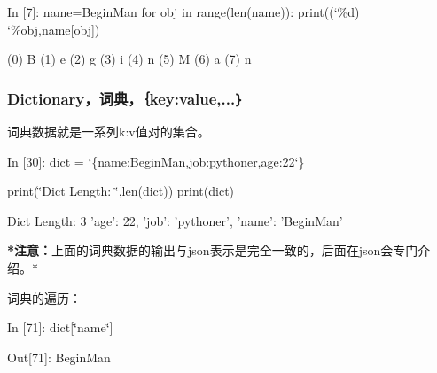 \documentclass[letterpaper,10pt,english]{sphinxmanual}
\def\PYGZob{\char`\{}
\def\PYGZcb{\char`\}}
\def\PYGZpc{\char`\%}
\def\PYGZsq{\char`\'}
\def\PYGZdq{\char`\"}
\renewcommand\PYGZsq{\textquotesingle}
\begin{document}
\begin{OriginalVerbatim}[commandchars=\\\{\}]
\textcolor{nbsphinxin}{In [7]: }name=\PYGZsq{}BeginMan\PYGZsq{}
        for obj in range(len(name)):
            print(\PYGZsq{}(\PYGZpc{}d)\PYGZsq{} \PYGZpc{}obj,name[obj])
\end{OriginalVerbatim}
\begin{OriginalVerbatim}[commandchars=\\\{\}]
(0) B
(1) e
(2) g
(3) i
(4) n
(5) M
(6) a
(7) n
\end{OriginalVerbatim}

\subsubsection{Dictionary，词典，｛key:value,...｝}
\label{pystart/pystart_databasic:Dictionary_uff0c_u8bcd_u5178_uff0c_uff5bkey:value,..._uff5d}
词典数据就是一系列k:v值对的集合。

\begin{OriginalVerbatim}[commandchars=\\\{\}]
\textcolor{nbsphinxin}{In [30]: }dict = \PYGZob{}\PYGZsq{}name\PYGZsq{}:\PYGZsq{}BeginMan\PYGZsq{},\PYGZsq{}job\PYGZsq{}:\PYGZsq{}pythoner\PYGZsq{},\PYGZsq{}age\PYGZsq{}:22\PYGZcb{}
         
         print(\PYGZdq{}Dict Length: \PYGZdq{},len(dict))
         print(dict)
\end{OriginalVerbatim}
\begin{OriginalVerbatim}[commandchars=\\\{\}]
Dict Length:  3
{'age': 22, 'job': 'pythoner', 'name': 'BeginMan'}
\end{OriginalVerbatim}
\textbf{*注意：}上面的词典数据的输出与json表示是完全一致的，后面在json会专门介绍。*

词典的遍历：

\begin{OriginalVerbatim}[commandchars=\\\{\}]
\textcolor{nbsphinxin}{In [71]: }dict[\PYGZdq{}name\PYGZdq{}]
\end{OriginalVerbatim}

\begin{OriginalVerbatim}[commandchars=\\\{\}]
\textcolor{nbsphinxout}{Out[71]: }\PYGZsq{}BeginMan\PYGZsq{}
\end{OriginalVerbatim}
\end{document}
